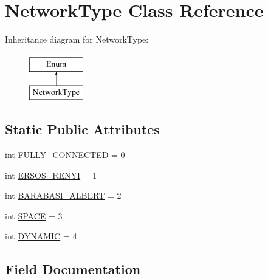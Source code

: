 \hypertarget{class_mu_mo_t_1_1_network_type}{}\section{Network\+Type Class Reference}
\label{class_mu_mo_t_1_1_network_type}
Inheritance diagram for Network\+Type\+:\begin{figure}[H]
\begin{center}
\leavevmode
\includegraphics[height=2.000000cm]{class_mu_mo_t_1_1_network_type}
\end{center}
\end{figure}
\subsection*{Static Public Attributes}
\begin{DoxyCompactItemize}
\item 
int \hyperlink{class_mu_mo_t_1_1_network_type_a6026c1d0088de63c8dbffa271c5cb8e4}{F\+U\+L\+L\+Y\+\_\+\+C\+O\+N\+N\+E\+C\+T\+ED} = 0
\item 
int \hyperlink{class_mu_mo_t_1_1_network_type_abfc09d249fa8a7e47ccae49424a21d61}{E\+R\+S\+O\+S\+\_\+\+R\+E\+N\+YI} = 1
\item 
int \hyperlink{class_mu_mo_t_1_1_network_type_a5684807d763efd4f800fe9a849cd962c}{B\+A\+R\+A\+B\+A\+S\+I\+\_\+\+A\+L\+B\+E\+RT} = 2
\item 
int \hyperlink{class_mu_mo_t_1_1_network_type_a03813c265f977cc034eb42fd3370bf3d}{S\+P\+A\+CE} = 3
\item 
int \hyperlink{class_mu_mo_t_1_1_network_type_ad86080ad7b724db9fc31c1e654eba020}{D\+Y\+N\+A\+M\+IC} = 4
\end{DoxyCompactItemize}


\subsection{Field Documentation}
\mbox{\label{class_mu_mo_t_1_1_network_type_a5684807d763efd4f800fe9a849cd962c}} 

